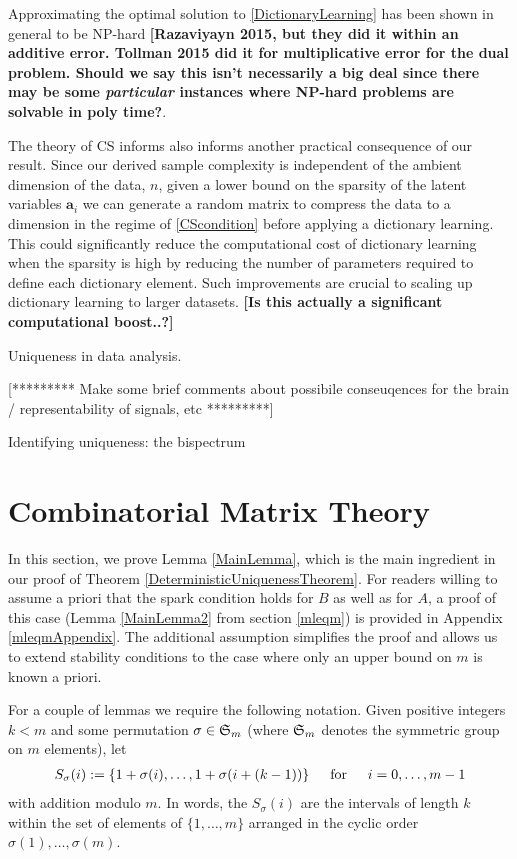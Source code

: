 \documentclass[journal, onecolumn]{IEEEtran}
\begin{document}
Approximating the optimal solution to \eqref{DictionaryLearning} has been shown in general to be NP-hard \cite{Razaviyayn} \textbf{[Razaviyayn 2015, but they did it within an additive error. Tollman 2015 did it for multiplicative error for the dual problem. Should we say this isn't necessarily a big deal since there may be some \emph{particular} instances where NP-hard problems are solvable in poly time?}. 

The theory of CS informs also informs another practical consequence of our result. Since our derived sample complexity is independent of the ambient dimension of the data, $n$, given a lower bound on the sparsity of the latent variables $\mathbf{a}_i$ we can generate a random matrix to compress the data to a dimension in the regime of \eqref{CScondition} before applying a dictionary learning. This could significantly reduce the computational cost of dictionary learning when the sparsity is high by reducing the number of parameters required to define each dictionary element. Such improvements are crucial to scaling up dictionary learning to larger datasets. \textbf{[Is this actually a significant computational boost..?]}

Uniqueness in data analysis.

[********* Make some brief comments about possibile conseuqences for the brain / representability of signals, etc *********]


Identifying uniqueness: the bispectrum


\appendices
\section{Combinatorial Matrix Theory}\label{appendixA}

In this section, we prove Lemma \ref{MainLemma}, which is the main ingredient in our proof of Theorem \ref{DeterministicUniquenessTheorem}. For readers willing to assume a priori that the spark condition holds for $B$ as well as for $A$, a proof of this case (Lemma \ref{MainLemma2} from section \ref{mleqm}) is provided in Appendix \ref{mleqmAppendix}. The additional assumption simplifies the proof and allows us to extend stability conditions to the case where only an upper bound on $m$ is known a priori. 

For a couple of lemmas we require the following notation. Given positive integers $k < m$ and some permutation $\sigma \in \frak{S}_m$ (where $\frak{S}_m$ denotes the symmetric group on $m$ elements), let
\begin{align}
S_\sigma(i) := \{1+\sigma(i), \ldots, 1+\sigma(i + (k-1)) \} \indent \text{for} \indent i = 0, \ldots, m-1
\end{align}
%
with addition modulo $m$. In words, the $S_\sigma(i)$ are the intervals of length $k$ within the set of elements of $\{1, \ldots, m\}$ arranged in the cyclic order $\sigma(1), \ldots, \sigma(m)$.
\end{document}
